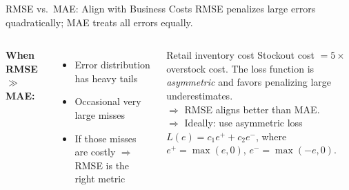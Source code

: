 \documentclass[aspectratio=169, 11pt]{beamer}
\begin{document}
\begin{frame}{RMSE vs.\ MAE: Align with Business Costs}
  RMSE penalizes large errors quadratically; MAE treats all errors equally.
  \begin{columns}[T]
      \textbf{When RMSE $\gg$ MAE:}
      \begin{itemize}\small
        \item Error distribution has heavy tails
        \item Occasional very large misses
        \item If those misses are costly $\Rightarrow$ RMSE is the right metric
      \end{itemize}
      \vspace{0.1cm}
      \begin{examplebox}{Retail inventory cost}
        {\small Stockout cost $= 5\times$ overstock cost.
        The loss function is \emph{asymmetric} and favors penalizing
        large underestimates.\\[3pt]
        $\Rightarrow$ RMSE aligns better than MAE.\\[3pt]
        $\Rightarrow$ Ideally: use asymmetric loss $L(e) = c_1 e^{+}
        + c_2 e^{-}$, where $e^{+}=\max(e,0)$, $e^{-}=\max(-e,0)$.}
      \end{examplebox}
  \end{columns}
\end{frame}
\end{document}
